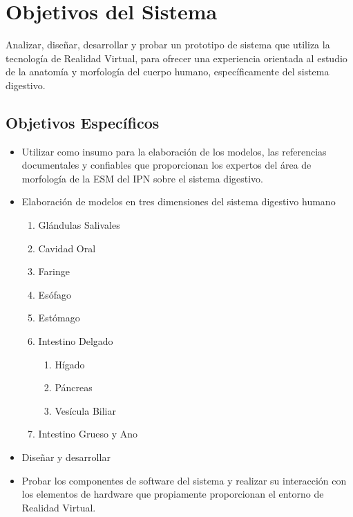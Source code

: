 \section{Objetivos del Sistema}
Analizar, diseñar, desarrollar y probar un prototipo de sistema que utiliza la tecnología de Realidad Virtual, para ofrecer una experiencia orientada al estudio 
de la anatomía y morfología del cuerpo humano, específicamente del sistema digestivo.\\
\subsection{Objetivos Específicos}
\begin{itemize}
	\item Utilizar como insumo para la elaboración de los modelos, las referencias documentales y confiables que proporcionan los expertos del área de morfología de la ESM del IPN sobre el sistema digestivo.
	\item Elaboración de modelos en tres dimensiones del sistema digestivo humano
	\begin{enumerate}
		\item Glándulas Salivales
		\item Cavidad Oral
		\item Faringe
		\item Esófago
		\item Estómago
		\item Intestino Delgado
		\begin{enumerate}
		  \item Hígado
		  \item Páncreas
		  \item Vesícula Biliar
		\end{enumerate}
		\item Intestino Grueso y Ano  
	\end{enumerate}
	\item Diseñar y desarrollar
	\item Probar los componentes de software del sistema y realizar su interacción con los elementos de hardware que propiamente proporcionan el entorno de  Realidad Virtual.	
\end{itemize}

